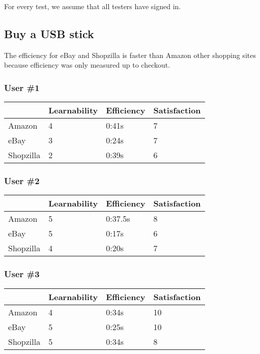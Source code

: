 \documentclass[11pt, oneside]{article}   	%
\begin{document}
For every test, we assume that all testers have signed in.

\subsection{Buy a USB stick}

The efficiency for eBay and Shopzilla is faster than Amazon other shopping sites because efficiency was only measured up to checkout.

\subsubsection{User \#1}

\begin{tabular}{| l | l | l | l |}
    \hline
     & Learnability & Efficiency & Satisfaction \\ \hline
    Amazon & 4 & 0:41s & 7 \\ \hline
    eBay & 3 & 0:24s & 7 \\ \hline
    Shopzilla & 2 & 0:39s & 6 \\\hline
\end{tabular}

\subsubsection{User \#2}

\begin{tabular}{| l | l | l | l |}
    \hline
     & Learnability & Efficiency & Satisfaction \\ \hline
    Amazon & 5 & 0:37.5s & 8 \\ \hline
    eBay & 5 & 0:17s & 6 \\ \hline
    Shopzilla & 4 & 0:20s & 7 \\ \hline
\end{tabular}

\subsubsection{User \#3}

\begin{tabular}{| l | l | l | l |}
    \hline
     & Learnability & Efficiency & Satisfaction \\ \hline
    Amazon & 4 & 0:34s & 10 \\ \hline
    eBay & 5 & 0:25s & 10 \\ \hline
    Shopzilla & 5 & 0:34s & 8 \\ \hline
\end{tabular}
\end{document}
